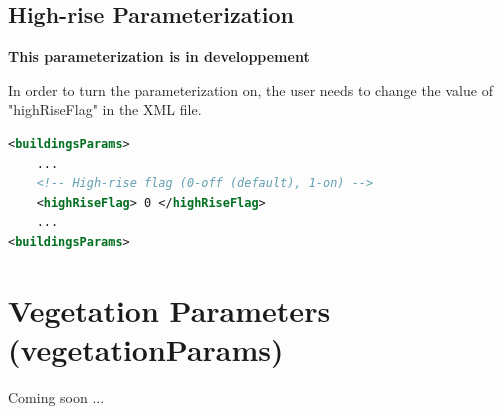 \subsection{High-rise Parameterization}

\textbf{This parameterization is in developpement}

In order to turn the parameterization on, the user needs to change the value of "highRiseFlag" in the XML file.

\begin{lstlisting}[language=XML]
<buildingsParams>
	...
	<!-- High-rise flag (0-off (default), 1-on) -->
    <highRiseFlag> 0 </highRiseFlag> 
	... 				
<buildingsParams>
\end{lstlisting}

\section{Vegetation Parameters (vegetationParams)}

Coming soon ...